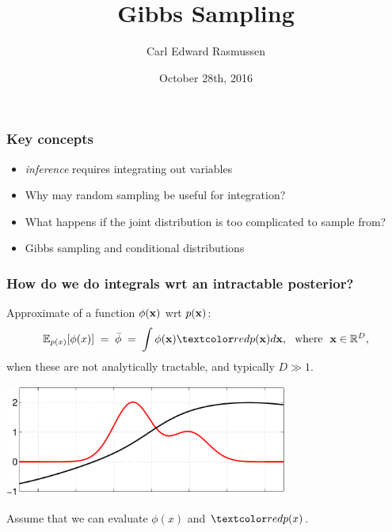 

\title{Gibbs Sampling}
\author{Carl Edward Rasmussen}
\date{October 28th, 2016}




\begin{frame}
\titlepage
\end{frame}


\begin{frame}
\frametitle{Key concepts}

\begin{itemize}
\item \emph{inference} requires integrating out variables
\item Why may random sampling be useful for integration?
\item What happens if the joint distribution is too complicated to sample from?
\item Gibbs sampling and conditional distributions
\end{itemize}

\end{frame}


\begin{frame}
\frametitle{How do we do integrals wrt an intractable posterior?}

Approximate  of a function $\phi(\mathbf x)$ wrt
 $p(\mathbf x)$:
\[
\E_{p(x)}[\phi(x)]\;=\;\bar\phi\;=\;\int \phi(\bfx)\Red{p(\bfx)}d\bfx,
\text{\ \ where\ \ }\bfx\in\R^D,
\]
when these are not analytically tractable, and typically $D\gg1$.
\begin{center}
\includegraphics[width=0.7\textwidth]{mc0}
\end{center}
Assume that we can evaluate $\phi(x)$ and $\Red{p(x)}$.
\end{frame}


